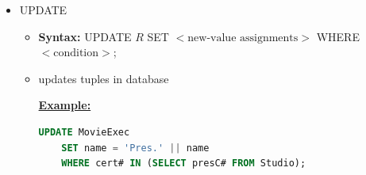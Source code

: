 \documentclass[12pt]{article}
\begin{document}
\begin{enumerate}[1.]
\begin{enumerate}[a)]
        \begin{itemize}
            \item UPDATE
            \begin{itemize}
                \item \textbf{Syntax:} UPDATE $R$ SET $<\text{new-value assignments}>$ WHERE $<\text{condition}>$;
                \item updates tuples in database

                \bigskip

                \underline{\textbf{Example:}}

                \bigskip

    \begin{lstlisting}[language=SQL]
    UPDATE MovieExec
    SET name = 'Pres.' || name
    WHERE cert# IN (SELECT presC# FROM Studio);
    \end{lstlisting}

            \end{itemize}


        \end{itemize}
    \end{enumerate}
\end{enumerate}
\end{document}
